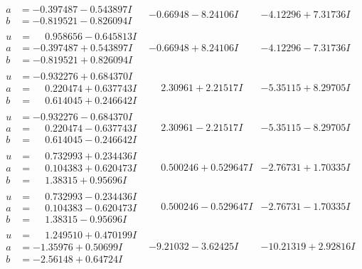 \documentclass[1p]{elsarticle_modified}
\theoremstyle{definition}
\begin{document}
$$\begin{array}{c|c|c}
\begin{aligned}
a &= -0.397487 - 0.543897 I \\
b &= -0.819521 - 0.826094 I\end{aligned}
 & -0.66948 - 8.24106 I & -4.12296 + 7.31736 I \\ \hline\begin{aligned}
u &= \phantom{-}0.958656 - 0.645813 I \\
a &= -0.397487 + 0.543897 I \\
b &= -0.819521 + 0.826094 I\end{aligned}
 & -0.66948 + 8.24106 I & -4.12296 - 7.31736 I \\ \hline\begin{aligned}
u &= -0.932276 + 0.684370 I \\
a &= \phantom{-}0.220474 + 0.637743 I \\
b &= \phantom{-}0.614045 + 0.246642 I\end{aligned}
 & \phantom{-}2.30961 + 2.21517 I & -5.35115 + 8.29705 I \\ \hline\begin{aligned}
u &= -0.932276 - 0.684370 I \\
a &= \phantom{-}0.220474 - 0.637743 I \\
b &= \phantom{-}0.614045 - 0.246642 I\end{aligned}
 & \phantom{-}2.30961 - 2.21517 I & -5.35115 - 8.29705 I \\ \hline\begin{aligned}
u &= \phantom{-}0.732993 + 0.234436 I \\
a &= \phantom{-}0.104383 + 0.620473 I \\
b &= \phantom{-}1.38315 + 0.95696 I\end{aligned}
 & \phantom{-}0.500246 + 0.529647 I & -2.76731 + 1.70335 I \\ \hline\begin{aligned}
u &= \phantom{-}0.732993 - 0.234436 I \\
a &= \phantom{-}0.104383 - 0.620473 I \\
b &= \phantom{-}1.38315 - 0.95696 I\end{aligned}
 & \phantom{-}0.500246 - 0.529647 I & -2.76731 - 1.70335 I \\ \hline\begin{aligned}
u &= \phantom{-}1.249510 + 0.470199 I \\
a &= -1.35976 + 0.50699 I \\
b &= -2.56148 + 0.64724 I\end{aligned}
 & -9.21032 - 3.62425 I & -10.21319 + 2.92816 I \\ \hline\begin{aligned}

\end{aligned}
\end{array}$$
\end{document}
